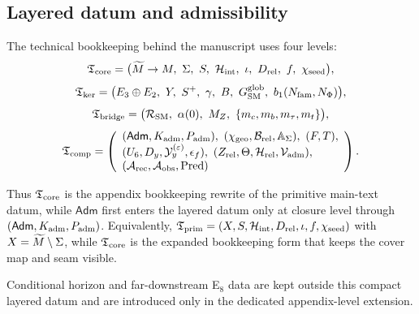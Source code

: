 \subsection{Layered datum and admissibility}

\begin{construction}
The technical bookkeeping behind the manuscript uses four levels:
\[
\Tcore
=
\bigl(
\widetilde M\to M,\ \Seam,\ S,\ \Hint,\ \inv,\ D_{\mathrm{rel}},\ f,\ \chiseed
\bigr),
\]
\[
\Tker
=
\bigl(
E_3\oplus E_2,\ Y,\ S^+,\ \gamma,\ B,\ G_{\SM}^{\mathrm{glob}},\ \bone(N_{\mathrm{fam}},N_\Phi)
\bigr),
\]
\[
\mathfrak T_{\mathrm{bridge}}
=
\bigl(
\mathcal R_{\mathrm{SM}},\ \alpha(0),\ M_Z,\ \{m_c,m_b,m_\tau,m_t\}
\bigr),
\]
\[
\Tcomp
=
\left(
\begin{array}{l}
(\mathsf{Adm},\Kadm,\Padm),\ (\chigeo,\mathcal B_{\mathrm{rel}},\mathbb A_{\Seam}),\ (F,T),\\
(U_6,D_y,\mathcal Y_y^{(\varepsilon)},\epsilon_f),\ (Z_{\mathrm{rel}},\Theta,\Hrel,\Vadm),\\
(\Arec,\Aobs,\Pred)
\end{array}
\right).
\]
\end{construction}

Thus $\mathfrak T_{\mathrm{core}}$ is the appendix bookkeeping rewrite of the primitive main-text datum, while $\mathsf{Adm}$ first enters the layered datum only at closure level through $(\mathsf{Adm},K_{\mathrm{adm}},P_{\mathrm{adm}})$.
Equivalently, $\mathfrak T_{\mathrm{prim}}=(X,S,\mathcal H_{\mathrm{int}},D_{\mathrm{rel}},\iota,f,\chi_{\mathrm{seed}})$ with
$X=\widetilde M\setminus\Sigma$, while $\mathfrak T_{\mathrm{core}}$ is the expanded bookkeeping form
that keeps the cover map and seam visible.

Conditional horizon and far-downstream E$_8$ data are kept outside this compact layered datum and are introduced only in the dedicated appendix-level extension.


